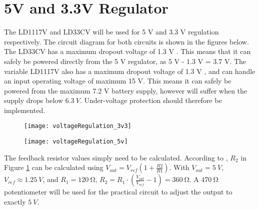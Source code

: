 \graphicspath{{content/2_design/figures}}

\section{5V and 3.3V Regulator}
The LD1117V and LD33CV will be used for 5 V and 3.3 V regulation respectively. The circuit diagram for both circuits is shown in the figures below.
The LD33CV has a maximum dropout voltage of 1.3 V \cite{datasheetLD1117}. This means that it can safely be powered directly from the 5 V regulator, as 5 V - 1.3 V = 3.7 V.
The variable LD1117V also has a maximum dropout voltage of 1.3 V \cite{datasheetLD1117}, and can handle an input operating voltage of maximum 15 V. This means it can safely be
powered from the maximum 7.2 V battery supply, however will suffer when the supply drops below $\SI{6.3}{V}$. Under-voltage protection should therefore be implemented.

\begin{figure}[!htb]
    \centering
    \begin{minipage}{.4\textwidth}
        \centering
        \texttt{[image: voltageRegulation\_3v3]}
        \label{fig:voltageRegulation_3v3}
    \end{minipage}
    \begin{minipage}{.4\textwidth}
        \centering
        \texttt{[image: voltageRegulation\_5v]}
        \label{fig:voltageRegulation_5v}
    \end{minipage}
\end{figure}

The feedback resistor values simply need to be calculated. According to \cite{datasheetLD1117}, $R_2$ in Figure \ref{fig:voltageRegulation_5v}
can be calculated using $V_{out} = V_{ref} (1 + \frac{R2}{R1})$. With $V_{out} = \SI{5}{V}$, $V_{ref} \approx \SI{1.25}{V}$, and $R_1 = \SI{120}{\ohm}$,
$R_2 = R_1 \cdot \left(\frac{V_{out}}{V_{ref}} - 1\right) = \SI{360}{\ohm}$. A $\SI{470}{\ohm}$ potentiometer will be used for the practical circuit to adjust the output to exactly $\SI{5}{V}$.

\pagebreak